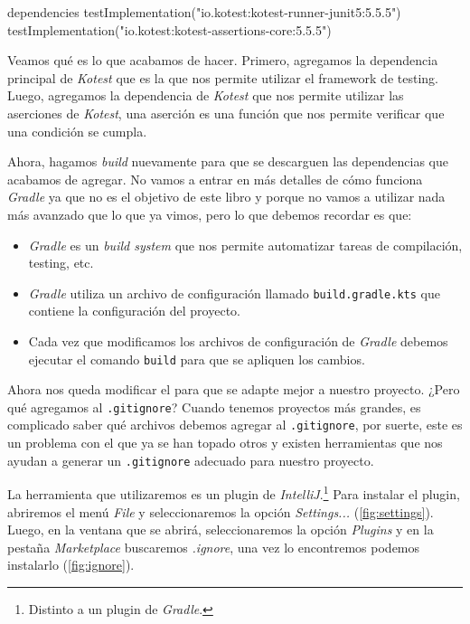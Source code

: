   \begin{kotlin}
    dependencies {
        testImplementation("io.kotest:kotest-runner-junit5:5.5.5")
        testImplementation("io.kotest:kotest-assertions-core:5.5.5")
    }
  \end{kotlin}

  Veamos qué es lo que acabamos de hacer.
  Primero, agregamos la dependencia principal de \textit{Kotest} que es la que nos permite
  utilizar el framework de testing.
  Luego, agregamos la dependencia de \textit{Kotest} que nos permite utilizar las aserciones de 
  \textit{Kotest}, una aserción es una función que nos permite verificar que una condición se 
  cumpla.

  Ahora, hagamos \textit{build} nuevamente para que se descarguen las dependencias que acabamos
  de agregar.
  No vamos a entrar en más detalles de cómo funciona \textit{Gradle} ya que no es el objetivo de
  este libro y porque no vamos a utilizar nada más avanzado que lo que ya vimos, pero lo que debemos
  recordar es que:

  \begin{itemize}
    \item \textit{Gradle} es un \textit{build system} que nos permite automatizar tareas de
      compilación, testing, etc.
    \item \textit{Gradle} utiliza un archivo de configuración llamado \texttt{build.gradle.kts}
      que contiene la configuración del proyecto.
    \item Cada vez que modificamos los archivos de configuración de \textit{Gradle} debemos
      ejecutar el comando \texttt{build} para que se apliquen los cambios.
  \end{itemize}

  Ahora nos queda modificar el  para que se adapte mejor a nuestro proyecto.
  ¿Pero qué agregamos al \texttt{.gitignore}?
  Cuando tenemos proyectos más grandes, es complicado saber qué archivos debemos agregar al
  \texttt{.gitignore}, por suerte, este es un problema con el que ya se han topado otros y existen
  herramientas que nos ayudan a generar un \texttt{.gitignore} adecuado para nuestro proyecto.

  La herramienta que utilizaremos es un plugin de \textit{IntelliJ}.\footnote{
    Distinto a un plugin de \textit{Gradle}.
  }
  Para instalar el plugin, abriremos el menú \textit{File} y seleccionaremos la opción
  \textit{Settings...} (\cref{fig:settings}).
  Luego, en la ventana que se abrirá, seleccionaremos la opción \textit{Plugins} y en la pestaña
  \textit{Marketplace} buscaremos \textit{.ignore}, una vez lo encontremos podemos instalarlo
  (\cref{fig:ignore}).

